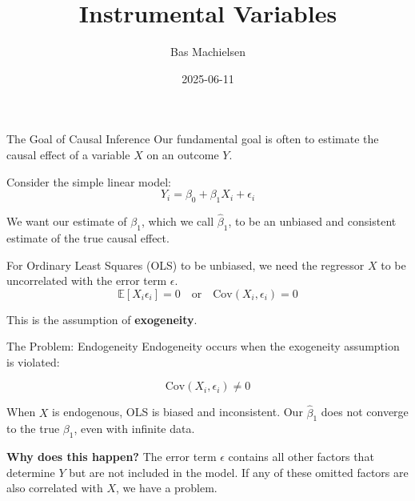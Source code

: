 \documentclass[
  ignorenonframetext,
  aspectratio=169]{beamer}
\title{Instrumental Variables}
\author{Bas Machielsen}
\date{2025-06-11}
\newcommand{\E}{\mathbb{E}}
\newcommand{\Cov}{\text{Cov}}
\begin{document}
\frame{\titlepage}

\begin{frame}{The Goal of Causal Inference}
\label{the-goal-of-causal-inference}
Our fundamental goal is often to estimate the causal effect of a
variable \(X\) on an outcome \(Y\).

Consider the simple linear model:
\[Y_i = \beta_0 + \beta_1 X_i + \epsilon_i\]

We want our estimate of \(\beta_1\), which we call \(\hat{\beta}_1\), to
be an unbiased and consistent estimate of the true causal effect.

For Ordinary Least Squares (OLS) to be unbiased, we need the regressor
\(X\) to be uncorrelated with the error term \(\epsilon\).
\[\E[X_i \epsilon_i] = 0 \quad \text{or} \quad \Cov(X_i, \epsilon_i) = 0\]

This is the assumption of \textbf{exogeneity}.
\end{frame}

\begin{frame}{The Problem: Endogeneity}
\label{the-problem-endogeneity}
Endogeneity occurs when the exogeneity assumption is violated:

\[ \Cov(X_i, \epsilon_i) \neq 0 \]

When \(X\) is endogenous, OLS is biased and inconsistent. Our
\(\hat{\beta}_1\) does not converge to the true \(\beta_1\), even with
infinite data.

\textbf{Why does this happen?} The error term \(\epsilon\) contains all
other factors that determine \(Y\) but are not included in the model. If
any of these omitted factors are also correlated with \(X\), we have a
problem.
\end{frame}
\end{document}
